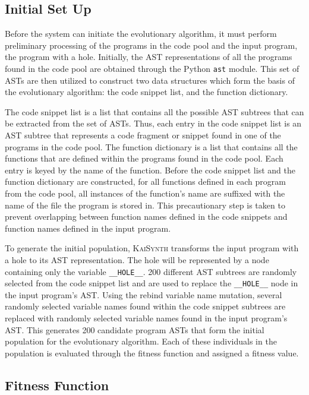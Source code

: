 \documentclass{article}
\begin{document}
\subsection{Initial Set Up}

Before the system can initiate the evolutionary algorithm, it must perform preliminary processing of the programs in the code pool and the input program, the program with a hole. Initially, the AST representations of all the programs found in the code pool are obtained through the Python \texttt{ast} module. This set of ASTs are then utilized to construct two data structures which form the basis of the evolutionary algorithm: the code snippet list, and the function dictionary.

The code snippet list is a list that contains all the possible AST subtrees that can be extracted from the set of ASTs. Thus, each entry in the code snippet list is an AST subtree that represents a code fragment or snippet found in one of the programs in the code pool. The function dictionary is a list that contains all the functions that are defined within the programs found in the code pool. Each entry is keyed by the name of the function. Before the code snippet list and the function dictionary are constructed, for all functions defined in each program from the code pool, all instances of the function's name are suffixed with the name of the file the program is stored in. This precautionary step is taken to prevent overlapping between function names defined in the code snippets and function names defined in the input program.

To generate the initial population, \textsc{KaiSynth} transforms the input program with a hole to its AST representation. The hole will be represented by a node containing only the variable \texttt{\_\_HOLE\_\_}. 200 different AST subtrees are randomly selected from the code snippet list and are used to replace the \texttt{\_\_HOLE\_\_} node in the input program's AST. Using the rebind variable name mutation, several randomly selected variable names found within the code snippet subtrees are replaced with randomly selected variable names found in the input program's AST. This generates 200 candidate program ASTs that form the initial population for the evolutionary algorithm. Each of these individuals in the population is evaluated through the fitness function and assigned a fitness value.

\subsection{Fitness Function}
\end{document}
